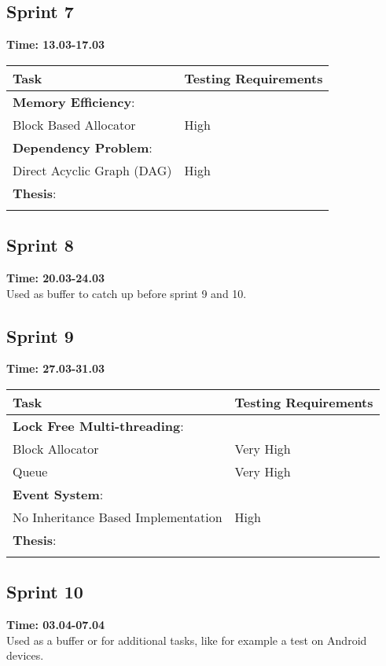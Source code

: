 \documentclass[hidelinks]{article}
\begin{document}
\subsection{Sprint 7}
\textbf{Time: 13.03-17.03}\\
\begin{tabularx}{\textwidth}{l >{\centering\arraybackslash}X}
\hline\noalign{\smallskip}
  Task                              & Testing Requirements   \\
\hline\noalign{\smallskip}
  \textbf{Memory Efficiency}:       &                        \\
  Block Based Allocator             & High                   \\
  
  \textbf{Dependency Problem}:      &                        \\ 
  Direct Acyclic Graph (DAG)        & High                   \\

  \textbf{Thesis}:                  &                        \\
\hline\noalign{\smallskip}
\end{tabularx}

\subsection{Sprint 8}
\textbf{Time: 20.03-24.03}\\
Used as buffer to catch up before sprint 9 and 10.

\subsection{Sprint 9}
\textbf{Time: 27.03-31.03}\\
\begin{tabularx}{\textwidth}{l >{\centering\arraybackslash}X}
\hline\noalign{\smallskip}
  Task                                & Testing Requirements   \\
\hline\noalign{\smallskip}
  \textbf{Lock Free Multi-threading}: &                        \\
  Block Allocator                     & Very High              \\
  Queue                               & Very High              \\
  
  \textbf{Event System}:              &                        \\ 
  No Inheritance Based Implementation & High                   \\

  \textbf{Thesis}:                    &                        \\
\hline\noalign{\smallskip}
\end{tabularx}

\subsection{Sprint 10}
\textbf{Time: 03.04-07.04}\\
Used as a buffer or for additional tasks, like for example a test on Android devices.
\end{document}
